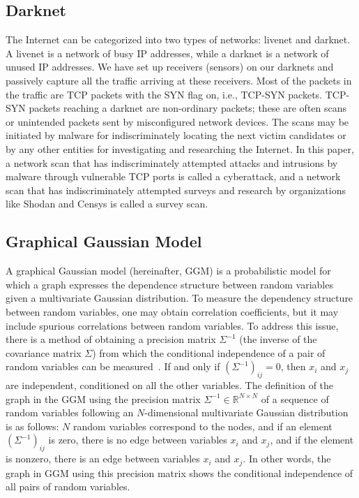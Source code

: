 \documentclass[conference]{IEEEtran}
\begin{document}
\subsection{Darknet}
The Internet can be categorized into two types of networks: livenet and darknet.
A livenet is a network of busy IP addresses, while a darknet is a network of unused IP addresses.
We have set up receivers (sensors) on our darknets and passively capture all the traffic arriving at these receivers.
Most of the packets in the traffic are TCP packets with the SYN flag on, i.e., TCP-SYN packets.
TCP-SYN packets reaching a darknet are non-ordinary packets; these are often scans or unintended packets sent by misconfigured network devices.
The scans may be initiated by malware for indiscriminately locating the next victim candidates or by any other entities for investigating and researching the Internet.
In this paper, a network scan that has indiscriminately attempted attacks and intrusions by malware through vulnerable TCP ports is called a cyberattack, and a network scan that has indiscriminately attempted surveys and research by organizations like Shodan and Censys is called a survey scan.



\subsection{Graphical Gaussian Model}
A graphical Gaussian model (hereinafter, GGM) is a probabilistic model for which a graph expresses the dependence structure between random variables given a multivariate Gaussian distribution.
To measure the dependency structure between random variables, one may obtain correlation coefficients, but it may include spurious correlations between random variables.
To address this issue, there is a method of obtaining a precision matrix $\Sigma^{-1}$ (the inverse of the covariance matrix $\Sigma$) from which the conditional independence of a pair of random variables can be measured~\cite{Ide}.
If and only if $(\Sigma^{-1})_{ij}=0$, then $x_ {i}$ and $x_ {j}$ are independent, conditioned on all the other variables.
The definition of the graph in the GGM using the precision matrix $\Sigma^{-1}\in\mathbb{R}^{N \times N}$ of a sequence of random variables following an $N$-dimensional multivariate Gaussian distribution is as follows: $N$ random variables correspond to the nodes, and if an element $(\Sigma^{-1})_{ij}$ is zero, there is no edge between variables $x_i$ and $x_j$, and if the element is nonzero, there is an edge between variables $x_i$ and $x_j$.
In other words, the graph in GGM using this precision matrix shows the conditional independence of all pairs of random variables.
\end{document}
